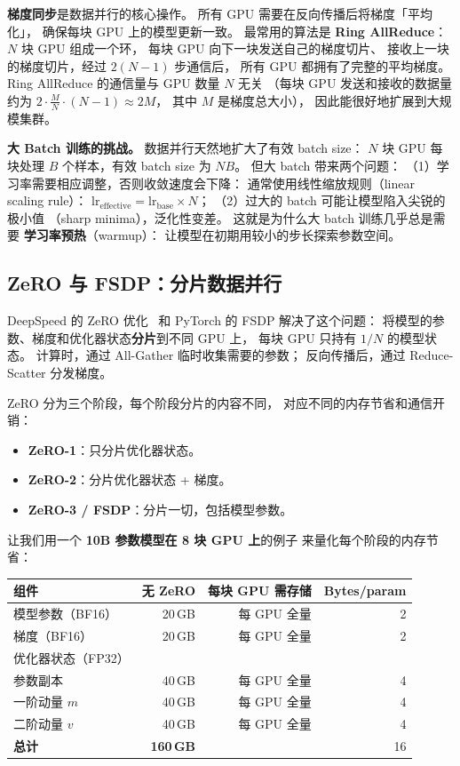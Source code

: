 \textbf{梯度同步}是数据并行的核心操作。
所有 GPU 需要在反向传播后将梯度「平均化」，
确保每块 GPU 上的模型更新一致。
最常用的算法是 \textbf{Ring AllReduce}：
$N$ 块 GPU 组成一个环，
每块 GPU 向下一块发送自己的梯度切片、
接收上一块的梯度切片，经过 $2(N-1)$ 步通信后，
所有 GPU 都拥有了完整的平均梯度。
Ring AllReduce 的通信量与 GPU 数量 $N$ 无关
（每块 GPU 发送和接收的数据量约为 $2 \cdot \frac{M}{N} \cdot (N-1) \approx 2M$，
其中 $M$ 是梯度总大小），
因此能很好地扩展到大规模集群。

\textbf{大 Batch 训练的挑战。}
数据并行天然地扩大了有效 batch size：
$N$ 块 GPU 每块处理 $B$ 个样本，有效 batch size 为 $NB$。
但大 batch 带来两个问题：
（1）学习率需要相应调整，否则收敛速度会下降：
通常使用线性缩放规则（linear scaling rule）：
$\mathrm{lr}_{\mathrm{effective}} = \mathrm{lr}_{\mathrm{base}} \times N$；
（2）过大的 batch 可能让模型陷入尖锐的极小值
（sharp minima），泛化性变差。
这就是为什么大 batch 训练几乎总是需要
\textbf{学习率预热}（warmup）：
让模型在初期用较小的步长探索参数空间。

\subsection{ZeRO 与 FSDP：分片数据并行}

DeepSpeed 的 ZeRO 优化~\cite{rajbhandari2020zero}
和 PyTorch 的 FSDP 解决了这个问题：
将模型的参数、梯度和优化器状态\textbf{分片}到不同 GPU 上，
每块 GPU 只持有 $1/N$ 的模型状态。
计算时，通过 All-Gather 临时收集需要的参数；
反向传播后，通过 Reduce-Scatter 分发梯度。

ZeRO 分为三个阶段，每个阶段分片的内容不同，
对应不同的内存节省和通信开销：

\begin{itemize}[noitemsep]
  \item \textbf{ZeRO-1}：只分片优化器状态。
  \item \textbf{ZeRO-2}：分片优化器状态 + 梯度。
  \item \textbf{ZeRO-3 / FSDP}：分片一切，包括模型参数。
\end{itemize}

让我们用一个 \textbf{10B 参数模型在 8 块 GPU 上}的例子
来量化每个阶段的内存节省：

\begin{center}\small
\renewcommand{\arraystretch}{1.3}
\begin{tabular}{lrrr}
  \toprule
  \rowcolor{figLightGray}
  \textbf{组件} & \textbf{无 ZeRO} & \textbf{每块 GPU 需存储} & \textbf{Bytes/param} \\
  \midrule
  模型参数（BF16） & 20\,GB & 每 GPU 全量 & 2 \\
  梯度（BF16） & 20\,GB & 每 GPU 全量 & 2 \\
  优化器状态（FP32） & & & \\
  \quad 参数副本 & 40\,GB & 每 GPU 全量 & 4 \\
  \quad 一阶动量 $m$ & 40\,GB & 每 GPU 全量 & 4 \\
  \quad 二阶动量 $v$ & 40\,GB & 每 GPU 全量 & 4 \\
  \midrule
  \textbf{总计} & \textbf{160\,GB} & & 16 \\
  \bottomrule
\end{tabular}
\end{center}

